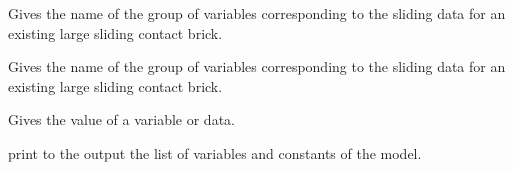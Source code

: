 \documentclass[a4paper,11pt,english]{sphinxmanual}
\begin{document}
\begin{fulllineitems}
\begin{fulllineitems}
\label{\detokenize{python/cmdref_Model:getfem.Model.transformation_name_of_Nitsche_large_sliding_contact_brick}}
Gives the name of the group of variables corresponding to the
sliding data for an existing large sliding contact brick.

\end{fulllineitems}


\begin{fulllineitems}
\label{\detokenize{python/cmdref_Model:getfem.Model.transformation_name_of_large_sliding_contact_brick}}
Gives the name of the group of variables corresponding to the
sliding data for an existing large sliding contact brick.

\end{fulllineitems}


\begin{fulllineitems}
\label{\detokenize{python/cmdref_Model:getfem.Model.variable}}
Gives the value of a variable or data.

\end{fulllineitems}


\begin{fulllineitems}
\label{\detokenize{python/cmdref_Model:getfem.Model.variable_list}}
print to the output the list of variables and constants of the model.

\end{fulllineitems}


\end{fulllineitems}
\end{document}
